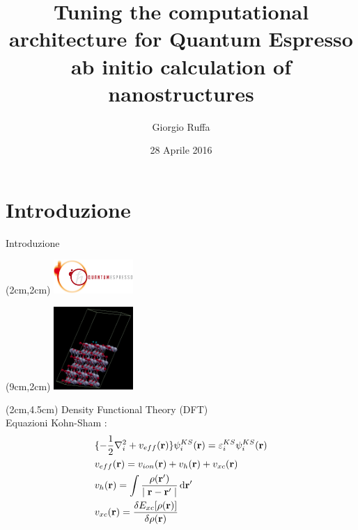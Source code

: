 \documentclass[10pt]{beamer}
\title[Tuning the computational architecture for Quantum Espresso ab initio calculation of nanostructures] %
{Tuning the computational architecture for Quantum Espresso ab initio calculation of nanostructures}
\author[Giorgio Ruffa] 
{Giorgio Ruffa}
\institute[Università degli Studi di Milano]{Università degli Studi di Milano}
\date{28 Aprile 2016}
\newcommand\dens{\rho(\mathbf{r})}
\newcommand\erre{\mathbf{r}}
\begin{document}
\begin{frame}
  \titlepage
\end{frame}

\section{Introduzione}

\begin{frame}{Introduzione}

\begin{textblock*}{3cm}(2cm,2cm) 
	\includegraphics[width=3cm]{beam_qe_logo.jpg}
\end{textblock*}

\begin{textblock*}{3cm}(9cm,2cm)
	\includegraphics[width=3cm]{titania_crystal.png}
\end{textblock*}

\begin{textblock*}{10cm}(2cm,4.5cm)
Density Functional Theory (DFT) \\
Equazioni Kohn-Sham : 
\begin{align*}
&\lbrace  - \frac{1}{2} \nabla_{i}^2+ v_{eff}(\erre) \rbrace 	\psi_{i}^{KS}(\erre) = \varepsilon_{i}^{KS} \psi_{i}^{KS}(\erre)\\
&v_{eff}(\erre) = v_{ion}(\erre) + v_{h}(\erre) + v_{xc}(\erre) \\ 
&v_{h}(\erre) = \int \frac{\rho(\erre')}{\mid \erre - \erre'\mid} \dd{\erre'}\\ 
&v_{xc}(\erre) =	\frac{\var{E_{xc}[\dens]}}{\var{\dens}}
\end{align*}

\end{textblock*}


\end{frame}
\end{document}
